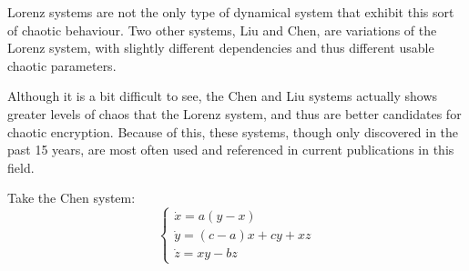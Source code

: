 \par Lorenz systems are not the only type of dynamical system that exhibit this sort of chaotic behaviour.  Two other systems, Liu and Chen, are variations of the Lorenz system, with slightly different dependencies and thus different usable chaotic parameters.

\par Although it is a bit difficult to see, the Chen and Liu systems actually shows greater levels of chaos that the Lorenz system, and thus are better candidates for chaotic encryption.  Because of this, these systems, though only discovered in the past 15 years,  are most often used and referenced in current publications in this field.

\par Take the Chen system:
%
\begin{equation}
\begin{cases} 
\dot{x} = a(y - x) \\ 
\dot{y} = (c - a)x + cy + xz \\
\dot{z} = xy - bz
\end{cases}
\end{equation}
%
\par 

%


